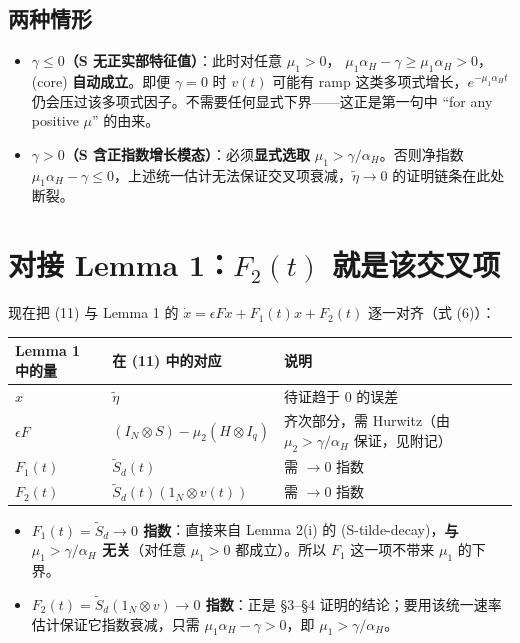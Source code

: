 \documentclass[UTF8]{ctexart}
\begin{document}
\subsection{两种情形}

\begin{itemize}
  \item \textbf{$\gamma \leq 0$（S 无正实部特征值）}：此时对任意 $\mu_1 > 0$，
  $\mu_1 \alpha_H - \gamma \geq \mu_1 \alpha_H > 0$，(core) \textbf{自动成立}。即便 $\gamma=0$ 时 $v(t)$ 可能有 ramp 这类多项式增长，$e^{-\mu_1\alpha_H t}$ 仍会压过该多项式因子。不需要任何显式下界——这正是第一句中 ``for any positive $\mu$'' 的由来。
  \item \textbf{$\gamma > 0$（S 含正指数增长模态）}：必须\textbf{显式选取} $\mu_1 > \gamma / \alpha_H$。否则净指数 $\mu_1 \alpha_H - \gamma \leq 0$，上述统一估计无法保证交叉项衰减，$\tilde{\eta} \to 0$ 的证明链条在此处断裂。
\end{itemize}

\section{对接 Lemma 1：$F_2(t)$ 就是该交叉项}

现在把 (11) 与 Lemma 1 的 $\dot{x} = \epsilon F x + F_1(t)x + F_2(t)$ 逐一对齐（式 (6)）：

\begin{table}[h]
\centering
\begin{tabularx}{\textwidth}{lllX}
\toprule
Lemma 1 中的量 & 在 (11) 中的对应 & 说明 \\
\midrule
$x$ & $\tilde{\eta}$ & 待证趋于 $0$ 的误差 \\
$\epsilon F$ & $(I_N \otimes S) - \mu_2(H \otimes I_q)$ & 齐次部分，需 Hurwitz（由 $\mu_2 > \gamma/\alpha_H$ 保证，见附记） \\
$F_1(t)$ & $\tilde{S}_d(t)$ & 需 $\to 0$ 指数 \\
\textbf{$F_2(t)$} & \textbf{$\tilde{S}_d(t)(1_N \otimes v(t))$} & 需 $\to 0$ 指数 \\
\bottomrule
\end{tabularx}
\end{table}

\begin{itemize}
  \item \textbf{$F_1(t) = \tilde{S}_d \to 0$ 指数}：直接来自 Lemma 2(i) 的 (S-tilde-decay)，\textbf{与 $\mu_1 > \gamma/\alpha_H$ 无关}（对任意 $\mu_1 > 0$ 都成立）。所以 $F_1$ 这一项不带来 $\mu_1$ 的下界。
  \item \textbf{$F_2(t) = \tilde{S}_d(1_N \otimes v) \to 0$ 指数}：正是 \S 3--\S 4 证明的结论；要用该统一速率估计保证它指数衰减，只需 $\mu_1 \alpha_H - \gamma > 0$，即 $\mu_1 > \gamma / \alpha_H$。
\end{itemize}
\end{document}
